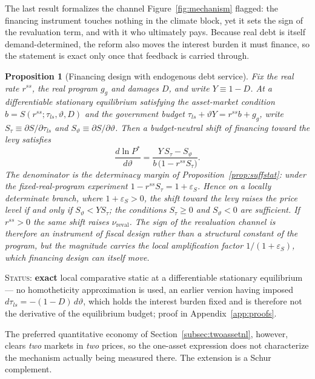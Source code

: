 \documentclass[12pt]{article}
\newtheorem{proposition}{Proposition}
\newcommand{\Sfun}{S}
\begin{document}
The last result formalizes the channel Figure~\ref{fig:mechanism} flagged:
the financing instrument touches nothing in the climate block, yet it sets
the sign of the revaluation term, and with it who ultimately pays. Because
real debt is itself demand-determined, the reform also moves the interest
burden it must finance, so the statement is exact only once that feedback
is carried through.

\begin{proposition}[Financing design with endogenous debt service]
\label{prop:financingdesign}
Fix the real rate $r^{ss}$, the real program $g_g$ and damages $D$, and write
$Y\equiv 1-D$. At a differentiable stationary equilibrium satisfying the
asset-market condition $b=\Sfun(r^{ss};\tau_{ls},\vartheta,D)$ and the
government budget $\tau_{ls}+\vartheta Y=r^{ss}b+g_g$, write
$\Sfun_\tau\equiv\partial\Sfun/\partial\tau_{ls}$ and
$\Sfun_\vartheta\equiv\partial\Sfun/\partial\vartheta$. Then a budget-neutral
shift of financing toward the levy satisfies
\begin{equation}
\frac{d\ln P^{*}}{d\vartheta}
=\frac{Y\,\Sfun_\tau-\Sfun_\vartheta}{b\,\bigl(1-r^{ss}\Sfun_\tau\bigr)} .
\label{eq:financingexact}
\end{equation}
The denominator is the determinacy margin of
Proposition~\ref{prop:suffstat}: under the fixed-real-program experiment
$1-r^{ss}\Sfun_\tau=1+\varepsilon_\Sfun$. Hence on a locally determinate
branch, where $1+\varepsilon_\Sfun>0$, the shift toward the levy raises the
price level \emph{if and only if} $\Sfun_\vartheta<Y\Sfun_\tau$; the
conditions $\Sfun_\tau\ge0$ and $\Sfun_\vartheta<0$ are sufficient. If
$r^{ss}>0$ the same shift raises $\nu_{\mathrm{reval}}$. The sign of the
revaluation channel is therefore an instrument of fiscal design rather than
a structural constant of the program, but the \emph{magnitude} carries the
local amplification factor $1/(1+\varepsilon_\Sfun)$, which financing design
can itself move.
\end{proposition}
\noindent\textsc{Status:} \textbf{exact} local comparative static at a
differentiable stationary equilibrium --- no homotheticity approximation is
used, an earlier version having imposed
$d\tau_{ls}=-(1-D)\,d\vartheta$, which holds the interest burden fixed and
is therefore not the derivative of the equilibrium budget; proof in
Appendix~\ref{app:proofs}.

The preferred quantitative economy of Section~\ref{subsec:twoassetnl},
however, clears \emph{two} markets in \emph{two} prices, so the one-asset
expression does not characterize the mechanism actually being measured
there. The extension is a Schur complement.
\end{document}
